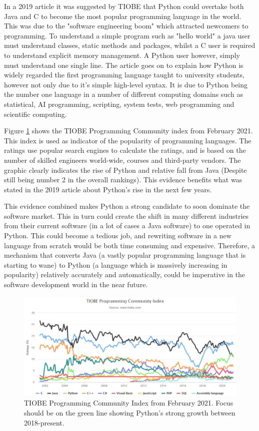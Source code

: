 \documentclass{l4proj}
\begin{document}
In a 2019 article it was suggested by TIOBE that Python could overtake both Java and C to become the most popular programming language in the world. This was due to the "software engineering boom" which attracted newcomers to programming. To understand a simple program such as "hello world" a java user must understand classes, static methods and packages, whilst a C user is required to understand explicit memory management. A Python user however, simply must understand one single line.
The article goes on to explain how Python is widely regarded the first programming language taught to university students, however not only due to it's simple high-level syntax. It is due to Python being the number one language in a number of different computing domains such as statistical, AI programming, scripting, system tests, web programming and scientific computing.

Figure \ref{fig:index} shows the TIOBE Programming Community index from February 2021. This index is used as indicator of the popularity of programming languages. The ratings use popular search engines to calculate the ratings, and is based on the number of skilled engineers world-wide, courses and third-party vendors. The graphic clearly indicates the rise of Python and relative fall from Java (Despite still being number 2 in the overall rankings). This evidence benefits what was stated in the 2019 article about Python's rise in the next few years.

This evidence combined makes Python a strong candidate to soon dominate the software market. This in turn could create the shift in many different industries from their current software (in a lot of cases a Java software) to one operated in Python. This could become a tedious job, and rewriting software in a new language from scratch would be both time consuming and expensive. Therefore, a mechanism that converts Java (a vastly popular programming language that is starting to wane) to Python (a language which is massively increasing in popularity) relatively accurately and automatically, could be imperative in the software development world in the near future.

\begin{figure}[htb]
    \centering
    \includegraphics[width=1\linewidth]{images/Programming Community Index.JPG}
        \caption{TIOBE Programming Community Index from February 2021. Focus should be on the green line showing Python's strong growth between 2018-present. 
    }
    \label{fig:index} 
\end{figure}
\end{document}
